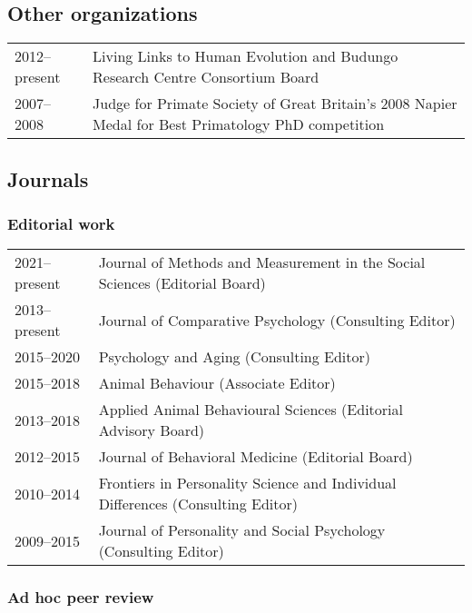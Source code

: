 \documentclass[11pt]{article}
\begin{document}
\subsection*{Other organizations}

\begin{tabular}{p{3cm}p{12cm}}
2012--present & Living Links to Human Evolution and Budungo Research
Centre Consortium Board \\
2007--2008 & Judge for Primate Society of Great Britain's 2008 Napier Medal
for Best Primatology PhD competition
\end{tabular}

\subsection*{Journals}

\subsubsection*{Editorial work}

\begin{tabular}{p{3cm}p{12cm}}
2021--present & Journal of Methods and Measurement in the Social
                Sciences (Editorial Board) \\
2013--present & Journal of Comparative Psychology (Consulting Editor) \\
2015--2020 & Psychology and Aging (Consulting Editor) \\
2015--2018 & Animal Behaviour (Associate Editor) \\
2013--2018 & Applied Animal Behavioural Sciences (Editorial Advisory Board) \\
2012--2015 & Journal of Behavioral Medicine (Editorial Board) \\
2010--2014 & Frontiers in Personality Science and Individual
Differences (Consulting Editor) \\
2009--2015 & Journal of Personality and Social Psychology (Consulting Editor)
\end{tabular}

\subsubsection*{Ad hoc peer review}
\end{document}
